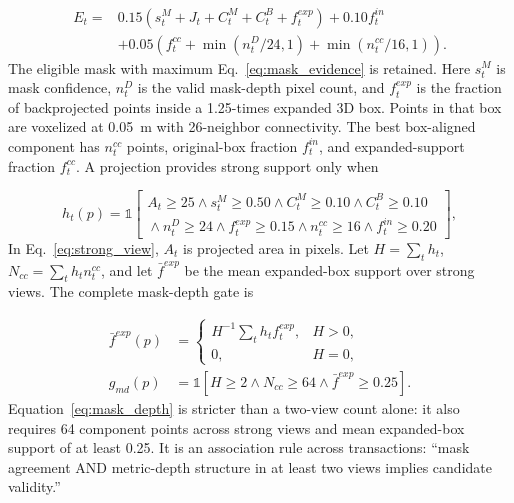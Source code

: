\documentclass[11pt,a4paper]{article}
\begin{document}
\begin{equation}
\begin{aligned}
E_t={}&0.15(s_t^M+J_t+C_t^M+C_t^B+f_t^{exp})+0.10f_t^{in}\\
&+0.05\!\left(f_t^{cc}+\min(n_t^D/24,1)+\min(n_t^{cc}/16,1)\right).
\end{aligned}
\label{eq:mask_evidence}
\end{equation}
The eligible mask with maximum Eq.~\eqref{eq:mask_evidence} is retained. Here \(s_t^M\) is mask confidence, \(n_t^D\) is the valid mask-depth pixel count, and \(f_t^{exp}\) is the fraction of backprojected points inside a 1.25-times expanded 3D box. Points in that box are voxelized at 0.05~m with 26-neighbor connectivity. The best box-aligned component has \(n_t^{cc}\) points, original-box fraction \(f_t^{in}\), and expanded-support fraction \(f_t^{cc}\). A projection provides strong support only when

\begin{equation}
h_t(p)=\mathbb{1}\!\left[
\begin{gathered}
A_t\ge25\land s_t^M\ge0.50\land C_t^M\ge0.10\land C_t^B\ge0.10\\
{}\land n_t^D\ge24\land f_t^{exp}\ge0.15\land n_t^{cc}\ge16\land f_t^{in}\ge0.20
\end{gathered}\right],
\label{eq:strong_view}
\end{equation}
In Eq.~\eqref{eq:strong_view}, \(A_t\) is projected area in pixels. Let \(H=\sum_t h_t\), \(N_{cc}=\sum_t h_tn_t^{cc}\), and let \(\bar f^{exp}\) be the mean expanded-box support over strong views. The complete mask-depth gate is

\begin{equation}
\begin{aligned}
\bar f^{exp}(p)&=\begin{cases}
H^{-1}\sum_t h_t f_t^{exp},&H>0,\\0,&H=0,
\end{cases}\\
g_{md}(p)&=\mathbb{1}\!\left[H\ge2\land N_{cc}\ge64\land\bar f^{exp}\ge0.25\right].
\end{aligned}
\label{eq:mask_depth}
\end{equation}
Equation~\eqref{eq:mask_depth} is stricter than a two-view count alone: it also requires 64 component points across strong views and mean expanded-box support of at least 0.25. It is an association rule across transactions: ``mask agreement AND metric-depth structure in at least two views implies candidate validity.''
\end{document}
